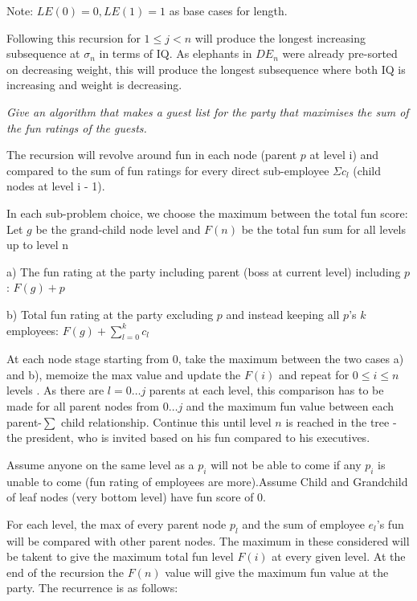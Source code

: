 \documentclass[11pt, a4paper]{article}
\begin{document}
Note: $LE(0) = 0, LE(1) = 1$ as base cases for length.

\vspace{2mm}

Following this recursion for $1 \le j < n$ will produce the longest increasing subsequence at $\sigma_n$ in terms of IQ. As elephants in $DE_n$ were already pre-sorted on decreasing weight, this will produce the longest subsequence where both IQ is increasing and weight is decreasing.


\vspace{35mm}

\textit{Give an algorithm that makes a guest list for the party that maximises the sum of the fun ratings of the guests.}

\vspace{2mm}
The recursion will revolve around fun in each node (parent $p$ at level i) and compared to the sum of fun ratings for every direct sub-employee $\Sigma c_l$ (child nodes at level i - 1). 

In each sub-problem choice, we choose the maximum between the total fun score: Let $g$ be the grand-child node level and $F(n)$ be the total fun sum for all levels up to level n

a) The fun rating at the party including parent (boss at current level) including $p$: $F(g) + p $

b) Total fun rating at the party excluding $p$ and instead keeping all $p$'s $k$ employees: $F(g) + \sum_{l= 0}^{k}  {c_l} $ 

At each node stage starting from 0, take the maximum between the two cases a) and b), memoize the max value and update the $F(i)$ and repeat for $0 \le i \le n$ levels . As there are $l = 0 \dots j$ parents at each level, this comparison has to be made for all parent nodes from $0 \dots j$ and the maximum fun value between each parent-$\sum$ child relationship. Continue this until level $n$ is reached in the tree - the president, who is invited based on his fun compared to his executives.


Assume anyone on the same level as a $p_i$ will not be able to come if any $p_i$ is unable to come (fun rating of employees are more).Assume Child and Grandchild of leaf nodes (very bottom level) have fun score of 0. 

For each level, the max of every parent node $p_l$ and the sum of employee $e_l$'s fun will be compared with other parent nodes. The maximum in these considered will be takent to give the maximum total fun level $F(i)$ at every given level. At the end of the recursion the $F(n)$ value will give the maximum fun value at the party. The recurrence is as follows:
\end{document}
